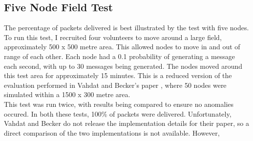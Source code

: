 \documentclass[12pt,a4paper]{report}
\begin{document}
\subsection{Five Node Field Test}
The percentage of packets delivered is best illustrated by the test with five nodes. To run this test, I recruited four volunteers to move around a large field, approximately 500 x 500 metre area. This allowed nodes to move in and out of range of each other. Each node had a 0.1 probability of generating a message each second, with up to 30 messages being generated. The nodes moved around this test area for approximately 15 minutes. This is a reduced version of the evaluation performed in Vahdat and Becker's paper \cite{epidemic}, where 50 nodes were simulated within a 1500 x 300 metre area. \\
This test was run twice, with results being compared to ensure no anomalies occured. In both these tests, 100\% of packets were delivered.
Unfortunately, Vahdat and Becker do not release the implementation details for their paper, so a direct comparison of the two implementations is not available. However, \\ \\
\end{document}
